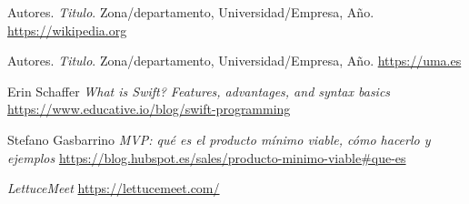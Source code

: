 
\begin{thebibliography}{9}
    Autores.
    \textit{Titulo}. Zona/departamento, Universidad/Empresa, Año.
    \url{https://wikipedia.org}

    Autores.
    \textit{Titulo}. Zona/departamento, Universidad/Empresa, Año.
    \url{https://uma.es}

    Erin Schaffer
    \textit{What is Swift? Features, advantages, and syntax basics}
    \url{https://www.educative.io/blog/swift-programming}

    Stefano Gasbarrino
    \textit{MVP: qué es el producto mínimo viable, cómo hacerlo y ejemplos}
    \url{https://blog.hubspot.es/sales/producto-minimo-viable#que-es}

    \textit{LettuceMeet}
    \url{https://lettucemeet.com/}
    
\end{thebibliography}